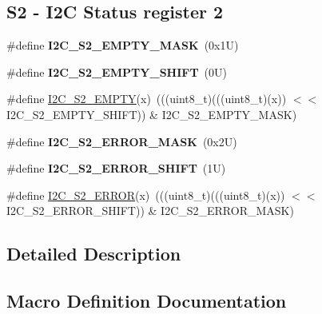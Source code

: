 \subsection*{S2 -\/ I2C Status register 2}
\begin{DoxyCompactItemize}
\item 
\mbox{\label{group___i2_c___register___masks_gad1d56490270ba36839d3fe1e8936141d}} 
\#define {\bfseries I2\+C\+\_\+\+S2\+\_\+\+E\+M\+P\+T\+Y\+\_\+\+M\+A\+SK}~(0x1\+U)
\item 
\mbox{\label{group___i2_c___register___masks_ga35fa1c2c022150ff61481c6f63f921a5}} 
\#define {\bfseries I2\+C\+\_\+\+S2\+\_\+\+E\+M\+P\+T\+Y\+\_\+\+S\+H\+I\+FT}~(0\+U)
\item 
\#define \mbox{\hyperlink{group___i2_c___register___masks_ga9452e33468f61916ec9b601564dcad53}{I2\+C\+\_\+\+S2\+\_\+\+E\+M\+P\+TY}}(x)~(((uint8\+\_\+t)(((uint8\+\_\+t)(x)) $<$$<$ I2\+C\+\_\+\+S2\+\_\+\+E\+M\+P\+T\+Y\+\_\+\+S\+H\+I\+FT)) \& I2\+C\+\_\+\+S2\+\_\+\+E\+M\+P\+T\+Y\+\_\+\+M\+A\+SK)
\item 
\mbox{\label{group___i2_c___register___masks_ga9979bfbaf3194593eddd31e6d5c1a5eb}} 
\#define {\bfseries I2\+C\+\_\+\+S2\+\_\+\+E\+R\+R\+O\+R\+\_\+\+M\+A\+SK}~(0x2\+U)
\item 
\mbox{\label{group___i2_c___register___masks_gae208ee454bd351b6cb9b484004172a6b}} 
\#define {\bfseries I2\+C\+\_\+\+S2\+\_\+\+E\+R\+R\+O\+R\+\_\+\+S\+H\+I\+FT}~(1\+U)
\item 
\#define \mbox{\hyperlink{group___i2_c___register___masks_gacb63cd2afab181a0256ec7731002eb3f}{I2\+C\+\_\+\+S2\+\_\+\+E\+R\+R\+OR}}(x)~(((uint8\+\_\+t)(((uint8\+\_\+t)(x)) $<$$<$ I2\+C\+\_\+\+S2\+\_\+\+E\+R\+R\+O\+R\+\_\+\+S\+H\+I\+FT)) \& I2\+C\+\_\+\+S2\+\_\+\+E\+R\+R\+O\+R\+\_\+\+M\+A\+SK)
\end{DoxyCompactItemize}


\subsection{Detailed Description}


\subsection{Macro Definition Documentation}
\mbox{\label{group___i2_c___register___masks_ga5248771248d1964b566ca3de1cadf6a3}} 
